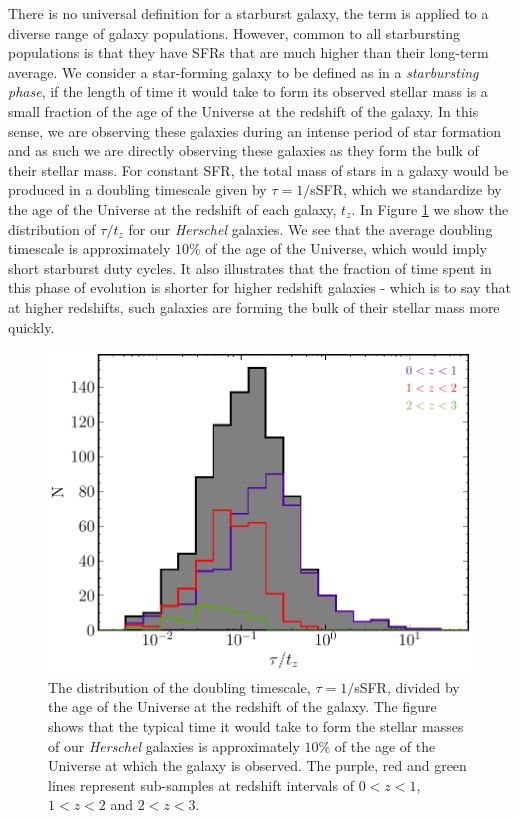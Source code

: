 There is no universal definition for a starburst galaxy, the term is applied to a diverse range of galaxy populations. However, common to all starbursting populations is that they have SFRs that are much higher than their long-term average. We consider a star-forming galaxy to be defined as in a \textit{starbursting phase}, if the length of time it would take to form its observed stellar mass is a small fraction of the age of the Universe at the redshift of the galaxy. In this sense, we are observing these galaxies during an intense period of star formation and as such we are directly observing these galaxies as they form the bulk of their stellar mass. For constant SFR, the total mass of stars in a galaxy would be produced in a doubling timescale given by $\tau = 1/$sSFR, which we standardize by the age of the Universe at the redshift of each galaxy, $t_z$. In Figure \ref{fig:tau_against_age} we show the distribution of $\tau/t_z$ for our \textit{Herschel} galaxies. We see that the average doubling timescale is approximately $10\%$ of the age of the Universe, which would imply short starburst duty cycles. It also illustrates that the fraction of time spent in this phase of evolution is shorter for higher redshift galaxies - which is to say that at higher redshifts, such galaxies are forming the bulk of their stellar mass more quickly.

\begin{figure}
	\centering
	\includegraphics[width=0.77\columnwidth]{Figures/tau_against_age.pdf}
	\caption[Doubling timescale of \textit{Herschel} galaxies]{The distribution of the doubling timescale, $\tau = 1/$sSFR, divided by the age of the Universe at the redshift of the galaxy. The figure shows that the typical time it would take to form the stellar masses of our \textit{Herschel} galaxies is approximately $10\%$ of the age of the Universe at which the galaxy is observed. The purple, red and green lines represent sub-samples at redshift intervals of $0 < z < 1$, $1 < z < 2$ and $2 < z < 3$.}
	\label{fig:tau_against_age}
\end{figure}


